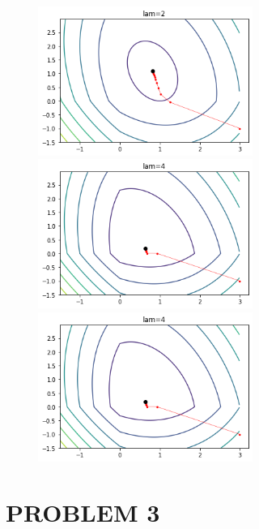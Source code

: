 \documentclass[a4j,11pt]{jarticle}
\begin{document}
\begin{figure}[htbp]
    \begin{minipage}{0.5\hsize}
     \begin{center}
      \includegraphics[width=70mm]{p2-1.png}
     \end{center}
    \end{minipage}
    \begin{minipage}{0.5\hsize}
     \begin{center}
      \includegraphics[width=70mm]{p2-2.png}
     \end{center}
    \end{minipage}
    \begin{minipage}{0.5\hsize}
     \begin{center}
      \includegraphics[width=70mm]{p2-2.png}
     \end{center}
    \end{minipage}
\end{figure}


\newpage
\section{PROBLEM 3}
\end{document}
